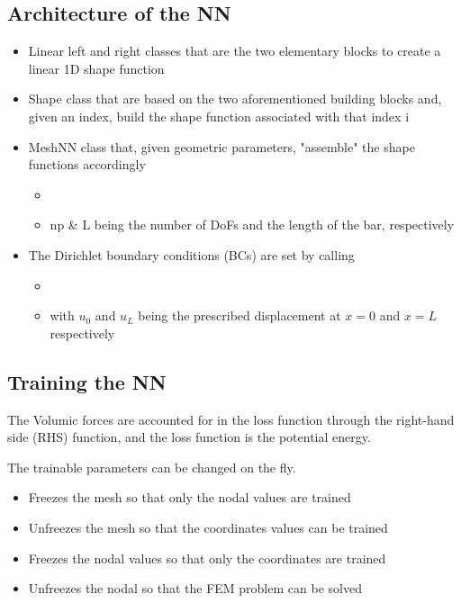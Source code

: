 \subsection{Architecture of the NN}


\begin{itemize}
    \item Linear left and right classes that are the two elementary blocks to create a linear 1D shape function
   \item Shape class that are based on the two aforementioned building blocks and, given an index, build the shape function associated with that index i
   \item MeshNN class that, given geometric parameters, "assemble" the shape functions accordingly
    \begin{itemize}
        \item {}
        \item np \& L being the number of DoFs and the length of the bar, respectively
   \end{itemize}
   \item The Dirichlet boundary conditions (BCs) are set by calling
   \begin{itemize}
        \item {} 
        \item with $u_0$ and $u_L$ being the prescribed displacement at $x=0$ and $x=L$ respectively
        \end{itemize}
\end{itemize}

\subsection{Training the NN }

The Volumic forces are accounted for in the loss function through the right-hand side (RHS) function, and the loss function is the potential energy.

The trainable parameters can be changed on the fly. 
\begin{itemize}
    \item {} Freezes the mesh so that only the nodal values are trained
    \item {} Unfreezes the mesh so that the coordinates values can be trained
    \item {} Freezes the nodal values so that only the coordinates are trained
    \item {} Unfreezes the nodal so that the FEM problem can be solved
\end{itemize}


